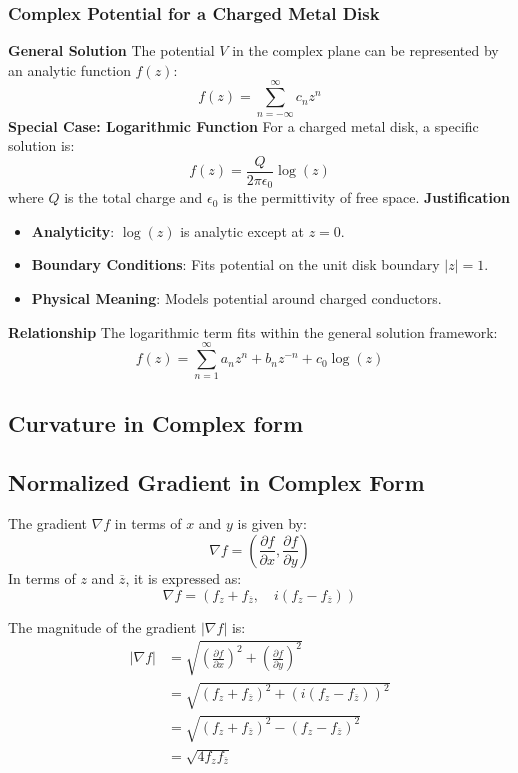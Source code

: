 \subsubsection{Complex Potential for a Charged Metal Disk}
\textbf{General Solution}
The potential \( V \) in the complex plane can be represented by an analytic function \( f(z) \):
\[
f(z) = \sum_{n=-\infty}^{\infty} c_n z^n
\]
\textbf{Special Case: Logarithmic Function}
For a charged metal disk, a specific solution is:
\[
f(z) = \frac{Q}{2\pi \epsilon_0} \log(z)
\]
where \( Q \) is the total charge and \( \epsilon_0 \) is the permittivity of free space.
\textbf{Justification}
\begin{itemize}
    \item \textbf{Analyticity}: \(\log(z)\) is analytic except at \( z = 0 \).
    \item \textbf{Boundary Conditions}: Fits potential on the unit disk boundary \( |z| = 1 \).
    \item \textbf{Physical Meaning}: Models potential around charged conductors.
\end{itemize}
\textbf{Relationship}
The logarithmic term fits within the general solution framework:
\[
f(z) = \sum_{n=1}^{\infty} a_n z^n + b_n z^{-n} + c_0 \log(z)
\]



\subsection{Curvature in Complex form}
\subsection{Normalized Gradient in Complex Form}

The gradient $\nabla f$ in terms of $x$ and $y$ is given by:
\[ 
\nabla f = \left( \frac{\partial f}{\partial x}, \frac{\partial f}{\partial y} \right) 
\]
In terms of $z$ and $\overline{z}$, it is expressed as:
\[ 
\nabla f = \left( f_z + f_{\overline{z}}, \quad i \left( f_z - f_{\overline{z}} \right) \right) 
\]

The magnitude of the gradient $|\nabla f|$ is:
\[ 
\begin{split}
|\nabla f| &= \sqrt{\left( \frac{\partial f}{\partial x} \right)^2 + \left( \frac{\partial f}{\partial y} \right)^2} \\
&= \sqrt{\left( f_z + f_{\overline{z}} \right)^2 + \left( i \left( f_z - f_{\overline{z}} \right) \right)^2} \\
&= \sqrt{\left( f_z + f_{\overline{z}} \right)^2 - \left( f_z - f_{\overline{z}} \right)^2} \\
&= \sqrt{4 f_z f_{\overline{z}}}
\end{split}
\]

